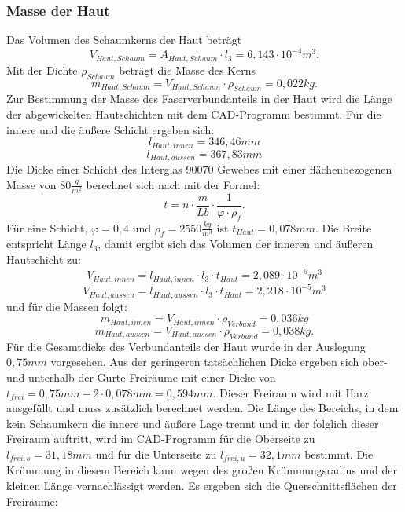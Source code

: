 \subsubsection{Masse der Haut}
Das Volumen des Schaumkerns der Haut beträgt 
\begin{equation}
	V_{Haut,Schaum}=A_{Haut,Schaum}\cdot l_{3}=6,143\cdot10^{-4}m^{3}.
\end{equation}
Mit der Dichte $ \rho_{Schaum} $ beträgt die Masse des Kerns
\begin{equation}
	m_{Haut,Schaum}=V_{Haut,Schaum}\cdot\rho_{Schaum}=0,022kg.
\end{equation}
Zur Bestimmung der Masse des Faserverbundanteils in der Haut wird die Länge der abgewickelten Hautschichten mit dem CAD-Programm bestimmt. Für die innere und die äußere Schicht ergeben sich:
\begin{equation}
	l_{Haut,innen}=346,46mm
\end{equation}
\begin{equation}
	l_{Haut,aussen}=367,83mm
\end{equation}
Die Dicke einer Schicht des Interglas 90070 Gewebes mit einer flächenbezogenen Masse von $ 80\frac{g}{m^{2}} $
berechnet sich nach \cite{item3} mit der Formel:
\begin{equation}
	t=n\cdot\frac{m}{Lb}\cdot\frac{1}{\varphi\cdot\rho_{f}}.
\end{equation}
Für eine Schicht, $ \varphi=0,4 $ und $ \rho_{f}=2550\frac{kg}{m^{3}} $ ist $ t_{Haut}=0,078mm $.
Die Breite entspricht Länge $ l_{3} $, damit ergibt sich das Volumen der inneren und äußeren Hautschicht zu:
\begin{equation}
	V_{Haut,innen}=l_{Haut,innen}\cdot l_{3}\cdot t_{Haut}=2,089\cdot 10^{-5}m^{3}
\end{equation}
\begin{equation}
	V_{Haut,aussen}=l_{Haut,aussen}\cdot l_{3}\cdot t_{Haut}=2,218\cdot 10^{-5}m^{3}
\end{equation}
und für die Massen folgt:
\begin{equation}
	m_{Haut,innen}=V_{Haut,innen}\cdot \rho_{Verbund}=0,036kg
\end{equation}
\begin{equation}
	m_{Haut,aussen}=V_{Haut,aussen}\cdot \rho_{Verbund}=0,038kg.
\end{equation}
Für die Gesamtdicke des Verbundanteils der Haut wurde in der Auslegung $ 0,75mm $ vorgesehen. Aus der geringeren tatsächlichen Dicke ergeben sich ober- und unterhalb der Gurte Freiräume mit einer Dicke von $t_{frei}= 0,75mm-2\cdot 0,078mm=0,594mm $. Dieser Freiraum wird mit Harz ausgefüllt und muss zusätzlich berechnet werden. Die Länge des Bereichs, in dem kein Schaumkern die innere und äußere Lage trennt und in der folglich dieser Freiraum auftritt, wird im CAD-Programm für die Oberseite zu $ l_{frei,o}= 31,18mm $ und für die Unterseite zu $ l_{frei,u}=32,1mm $ bestimmt. Die Krümmung in diesem Bereich kann wegen des großen Krümmungsradius und der kleinen Länge vernachlässigt werden. Es ergeben sich die Querschnittsflächen der Freiräume:

